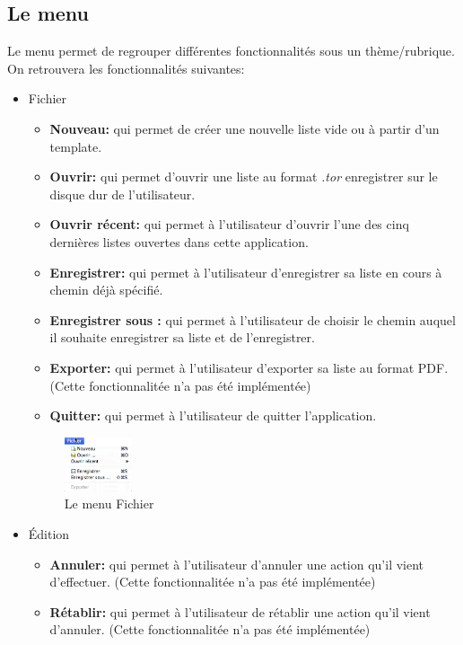 \documentclass[a4paper,10pt]{article}
\begin{document}
\subsection{Le menu}
Le menu permet de regrouper différentes fonctionnalités sous un thème/rubrique.
On retrouvera les fonctionnalités suivantes:
\begin{itemize}
\item Fichier
\begin{itemize}
\item \textbf{Nouveau:} qui permet de créer une nouvelle liste vide ou à partir d'un template.
\item \textbf{Ouvrir:} qui permet d'ouvrir une liste au format \textit{.tor} enregistrer sur le disque dur de l'utilisateur.
\item \textbf{Ouvrir récent:} qui permet à l'utilisateur d'ouvrir l'une des cinq dernières listes ouvertes dans cette application.
\item \textbf{Enregistrer:} qui permet à l'utilisateur d'enregistrer sa liste en cours à chemin déjà spécifié.
\item \textbf{Enregistrer sous :} qui permet à l'utilisateur de choisir le chemin auquel il souhaite enregistrer sa liste et de l'enregistrer.
\item \textbf{Exporter:} qui permet à l'utilisateur d'exporter sa liste au format PDF. (Cette fonctionnalitée n'a pas été implémentée)
\item \textbf{Quitter:} qui permet à l'utilisateur de quitter l'application.
\end{itemize}
\begin{figure}[H]
    \center
    \includegraphics[width=2cm]{Images/menuFichier.png}
    \caption{Le menu Fichier}
\end{figure}
\item Édition
\begin{itemize}
\item \textbf{Annuler:} qui permet à l'utilisateur d'annuler une action qu'il vient d'effectuer. (Cette fonctionnalitée n'a pas été implémentée)
\item \textbf{Rétablir:} qui permet à l'utilisateur de rétablir une action qu'il vient d'annuler. (Cette fonctionnalitée n'a pas été implémentée)

\end{itemize}
\end{itemize}
\end{document}

